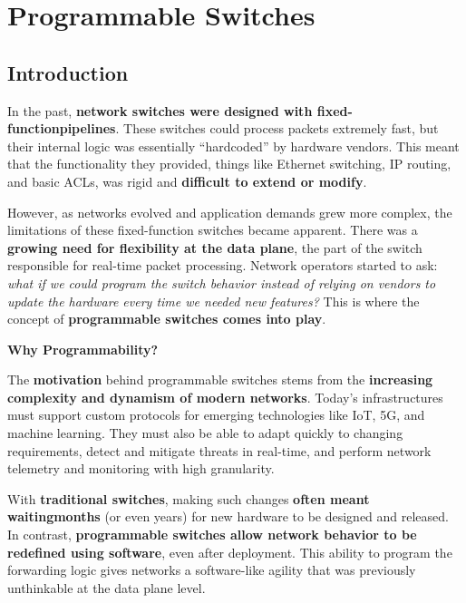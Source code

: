 \section{Programmable Switches}

\subsection{Introduction}

In the past, \textbf{network switches were designed with fixed-function\break pipelines}. These switches could process packets extremely fast, but their internal logic was essentially ``hardcoded'' by hardware vendors. This meant that the functionality they provided, things like Ethernet switching, IP routing, and basic ACLs, was rigid and \textbf{difficult to extend or modify}.

\highspace
However, as networks evolved and application demands grew more complex, the limitations of these fixed-function switches became apparent. There was a \textbf{growing need for flexibility at the data plane}, the part of the switch responsible for real-time packet processing. Network operators started to ask: \emph{what if we could \emph{program} the switch behavior instead of relying on vendors to update the hardware every time we needed new features?} This is where the concept of \textbf{programmable switches comes into play}.

\highspace
\begin{flushleft}
    \textcolor{Green3}{ \textbf{Why Programmability?}}
\end{flushleft}
The \textbf{motivation} behind programmable switches stems from the \textbf{increasing complexity and dynamism of modern networks}. Today's infrastructures must support custom protocols for emerging technologies like IoT, 5G, and machine learning. They must also be able to adapt quickly to changing requirements, detect and mitigate threats in real-time, and perform network telemetry and monitoring with high granularity.

\highspace
With \textbf{traditional switches}, making such changes \textbf{often meant waiting\break months} (or even years) for new hardware to be designed and released. In contrast, \textbf{programmable switches allow network behavior to be redefined using software}, even after deployment. This ability to program the forwarding logic gives networks a software-like agility that was previously unthinkable at the data plane level.

